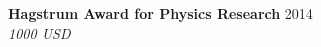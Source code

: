 \documentclass[10pt]{res} %
\begin{document}
\begin{resume}

\textbf{Hagstrum Award for Physics Research} \hfill 2014 \\
{\sl 1000 USD}









\end{resume}
\end{document}
